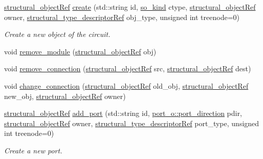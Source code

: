 \begin{DoxyCompactItemize}
\hyperlink{structural__objects_8hpp_a8ea5f8cc50ab8f4c31e2751074ff60b2}{structural\+\_\+object\+Ref} \hyperlink{classstructural__manager_a06768a4a0fd1f26e78cbd1186c433261}{create} (std\+::string id, \hyperlink{structural__objects_8hpp_acf52399aecacb7952e414c5746ce6439}{so\+\_\+kind} ctype, \hyperlink{structural__objects_8hpp_a8ea5f8cc50ab8f4c31e2751074ff60b2}{structural\+\_\+object\+Ref} owner, \hyperlink{structural__objects_8hpp_a219296792577e3292783725961506c83}{structural\+\_\+type\+\_\+descriptor\+Ref} obj\+\_\+type, unsigned int treenode=0)
\begin{DoxyCompactList}\small\item\em Create a new object of the circuit. \end{DoxyCompactList}\item 
void \hyperlink{classstructural__manager_a1160aa7f436e8238fe97864c86c834ad}{remove\+\_\+module} (\hyperlink{structural__objects_8hpp_a8ea5f8cc50ab8f4c31e2751074ff60b2}{structural\+\_\+object\+Ref} obj)
\item 
void \hyperlink{classstructural__manager_a5385fbdd2e9ce0f5a50e8d40ede945b2}{remove\+\_\+connection} (\hyperlink{structural__objects_8hpp_a8ea5f8cc50ab8f4c31e2751074ff60b2}{structural\+\_\+object\+Ref} src, \hyperlink{structural__objects_8hpp_a8ea5f8cc50ab8f4c31e2751074ff60b2}{structural\+\_\+object\+Ref} dest)
\item 
void \hyperlink{classstructural__manager_a0f66e3ac5c1075e8600c1ac69846866c}{change\+\_\+connection} (\hyperlink{structural__objects_8hpp_a8ea5f8cc50ab8f4c31e2751074ff60b2}{structural\+\_\+object\+Ref} old\+\_\+obj, \hyperlink{structural__objects_8hpp_a8ea5f8cc50ab8f4c31e2751074ff60b2}{structural\+\_\+object\+Ref} new\+\_\+obj, \hyperlink{structural__objects_8hpp_a8ea5f8cc50ab8f4c31e2751074ff60b2}{structural\+\_\+object\+Ref} owner)
\item 
\hyperlink{structural__objects_8hpp_a8ea5f8cc50ab8f4c31e2751074ff60b2}{structural\+\_\+object\+Ref} \hyperlink{classstructural__manager_a64e0c143cffd76072a1d5b885304a85a}{add\+\_\+port} (std\+::string id, \hyperlink{structport__o_adb254df5665ff28b0769491cc3899fd5}{port\+\_\+o\+::port\+\_\+direction} pdir, \hyperlink{structural__objects_8hpp_a8ea5f8cc50ab8f4c31e2751074ff60b2}{structural\+\_\+object\+Ref} owner, \hyperlink{structural__objects_8hpp_a219296792577e3292783725961506c83}{structural\+\_\+type\+\_\+descriptor\+Ref} port\+\_\+type, unsigned int treenode=0)
\begin{DoxyCompactList}\small\item\em Create a new port. \end{DoxyCompactList}\item 

\end{DoxyCompactItemize}
